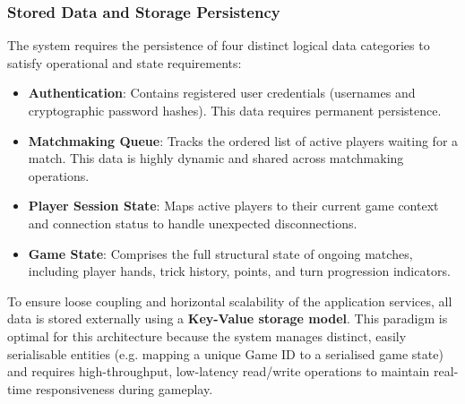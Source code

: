 \documentclass{scrartcl}
\begin{document}
\subsubsection*{Stored Data and Storage Persistency}
The system requires the persistence of four distinct logical data categories to satisfy operational and state requirements:
\begin{itemize}
    \item \textbf{Authentication}: Contains registered user credentials (usernames and cryptographic password hashes). This data requires permanent persistence.
    \item \textbf{Matchmaking Queue}: Tracks the ordered list of active players waiting for a match. This data is highly dynamic and shared across matchmaking operations.
    \item \textbf{Player Session State}: Maps active players to their current game context and connection status to handle unexpected disconnections.
    \item \textbf{Game State}: Comprises the full structural state of ongoing matches, including player hands, trick history, points, and turn progression indicators.
\end{itemize}
To ensure loose coupling and horizontal scalability of the application services, all data is stored externally using a \textbf{Key-Value storage model}. This paradigm is optimal for this architecture because the system manages distinct, easily serialisable entities (e.g. mapping a unique Game ID to a serialised game state) and requires high-throughput, low-latency read/write operations to maintain real-time responsiveness during gameplay.
\end{document}
